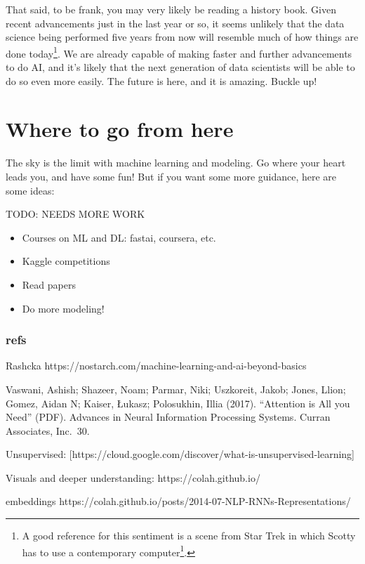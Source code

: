 \documentclass[
  letterpaper,
]{krantz}
\providecommand{\tightlist}{%
  \setlength{\itemsep}{0pt}\setlength{\parskip}{0pt}}\usepackage{longtable,booktabs,array}
\DeclareRobustCommand{\href}[2]{#2\footnote{\url{#1}}}
\begin{document}
That said, to be frank, you may very likely be reading a history book.
Given recent advancements just in the last year or so, it seems unlikely
that the data science being performed five years from now will resemble
much of how things are done today\footnote{A good reference for this
  sentiment is a scene from Star Trek in which
  \href{https://www.youtube.com/watch?v=hShY6xZWVGE}{Scotty has to use a
  contemporary computer}.}. We are already capable of making faster and
further advancements to do AI, and it's likely that the next generation
of data scientists will be able to do so even more easily. The future is
here, and it is amazing. Buckle up!

\section{Where to go from here}\label{where-to-go-from-here-3}

The sky is the limit with machine learning and modeling. Go where your
heart leads you, and have some fun! But if you want some more guidance,
here are some ideas:

TODO: NEEDS MORE WORK

\begin{itemize}
\tightlist
\item
  Courses on ML and DL: fastai, coursera, etc.
\item
  Kaggle competitions
\item
  Read papers
\item
  Do more modeling!
\end{itemize}

\subsubsection{refs}\label{refs-3}

Rashcka https://nostarch.com/machine-learning-and-ai-beyond-basics

Vaswani, Ashish; Shazeer, Noam; Parmar, Niki; Uszkoreit, Jakob; Jones,
Llion; Gomez, Aidan N; Kaiser, Łukasz; Polosukhin, Illia (2017).
``Attention is All you Need'' (PDF). Advances in Neural Information
Processing Systems. Curran Associates, Inc.~30.

Unsupervised:
{[}https://cloud.google.com/discover/what-is-unsupervised-learning{]}

Visuals and deeper understanding: https://colah.github.io/

embeddings
https://colah.github.io/posts/2014-07-NLP-RNNs-Representations/
\end{document}
